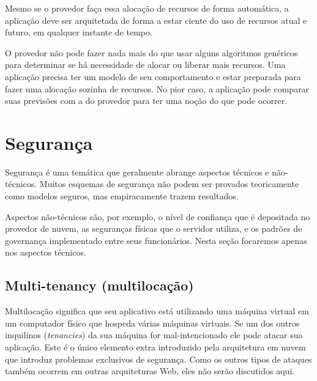 Mesmo se o provedor faça essa alocação de recursos de forma automática, a aplicação deve ser arquitetada de forma a estar ciente do uso de recursos atual e futuro, em qualquer instante de tempo. 

O provedor não pode fazer nada mais do que usar alguns algoritmos genéricos para determinar se há necessidade de alocar ou liberar mais recursos. Uma aplicação precisa ter um modelo de seu comportamento e estar preparada para fazer uma alocação sozinha de recursos. No pior caso, a aplicação pode comparar suas previsões com a do provedor para ter uma noção do que pode ocorrer.


\section{Segurança}
Segurança é uma temática que geralmente abrange aspectos técnicos e não-técnicos. Muitos esquemas de segurança não podem ser provados teoricamente como modelos seguros, mas empiracamente trazem resultados.

Aspectos não-técnicos são, por exemplo, o nível de confiança que é depositada no provedor de nuvem, as seguranças físicas que o servidor utiliza, e os padrões de governança implementado entre seus funcionários. Nesta seção focaremos apenas nos aspectos técnicos.

\subsection{Multi-tenancy (multilocação)}
Multilocação significa que seu aplicativo está utilizando uma máquina virtual em um computador físico que hospeda várias máquinas virtuais. Se um dos outros inquilinos (\textit{tenancies}) da sua máquina for mal-intencionado ele pode atacar sua aplicação.
Este é o único elemento extra introduzido pela arquitetura em nuvem que introduz problemas exclusivos de segurança. Como os outros tipos de ataques também ocorrem em outras arquiteturas Web, eles não serão discutidos aqui.

